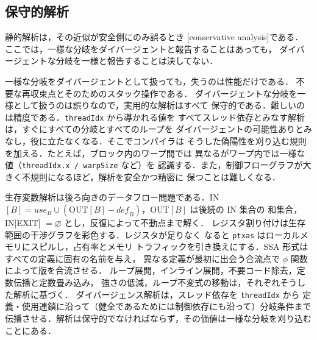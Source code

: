 \documentclass[../main.tex]{subfiles}
\begin{document}
\subsection{保守的解析}

\begin{definition}[保守的解析]
  \label{def:l11-conservative}
  静的解析は，その近似が安全側にのみ誤るとき
  [conservative analysis]である．
  ここでは，一様な分岐をダイバージェントと報告することはあっても，
  ダイバージェントな分岐を一様と報告することは決してない．
\end{definition}

一様な分岐をダイバージェントとして扱っても，失うのは性能だけである．
不要な再収束点とそのためのスタック操作である．%
ダイバージェントな分岐を一様として扱うのは誤りなので，実用的な解析はすべて
保守的である．難しいのは精度である．\texttt{threadIdx} から導かれる値を
すべてスレッド依存とみなす解析は，すぐにすべての分岐とすべてのループを
ダイバージェントの可能性ありとみなし，役に立たなくなる．そこでコンパイラは
そうした偽陽性を刈り込む規則を加える．たとえば，ブロック内のワープ間では
異なるがワープ内では一様な値（\texttt{threadIdx.x / warpSize} など）を
認識する．また，制御フローグラフが大きく不規則になるほど，解析を安全かつ精密に
保つことは難しくなる．

\begin{keypoint}[章のまとめ]
  生存変数解析は後ろ向きのデータフロー問題である．IN$[B] = \mathit{use}_B
  \cup (\mathrm{OUT}[B] - \mathit{def}_B)$，OUT$[B]$ は後続の IN 集合の
  和集合，IN[EXIT] $= \varnothing$ とし，反復によって不動点まで解く．
  レジスタ割り付けは生存範囲の干渉グラフを彩色する．レジスタが足りなく
  なると \texttt{ptxas} はローカルメモリにスピルし，占有率とメモリ
  トラフィックを引き換えにする．SSA 形式はすべての定義に固有の名前を与え，
  異なる定義が最初に出会う合流点で $\phi$ 関数によって版を合流させる．
  ループ展開，インライン展開，不要コード除去，定数伝播と定数畳み込み，
  強さの低減，ループ不変式の移動は，それぞれそうした解析に基づく．
  ダイバージェンス解析は，スレッド依存を \texttt{threadIdx} から
  定義・使用連鎖に沿って（健全であるためには制御依存にも沿って）分岐条件まで
  伝播させる．解析は保守的でなければならず，その価値は一様な分岐を刈り込む
  ことにある．
\end{keypoint}
\end{document}
